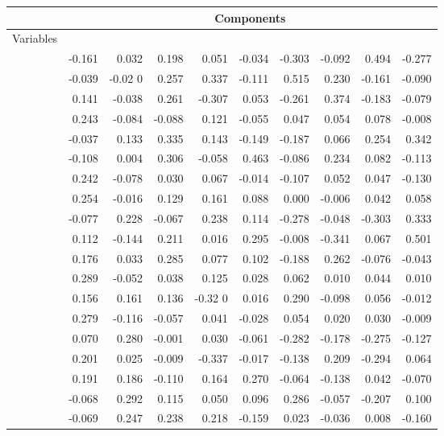 \documentclass[10pt]{article}
\begin{document}
\begin{table}
\begin{center}
\begin{tabular}{crrrrrrrrr}
\hline
			& \multicolumn{9}{c}{Components}																					\\\hline
Variables   &	  &          & 	   &       &	   &	   &	  	&	  &	 	\\
\hline
	&	-0.161	&	0.032	&	0.198	&	0.051	&	-0.034	&	-0.303	&	-0.092	&	0.494	&	-0.277	\\
	&	-0.039	&	-0.02	0       &	0.257	&	0.337	&	-0.111	&	0.515	&	0.230	&	-0.161	&	-0.090	\\
	&	0.141	&	-0.038	&	0.261	&	-0.307	&	0.053	&	-0.261	&	0.374	&	-0.183	&	-0.079	\\
	&	0.243	&	-0.084	&	-0.088	&	0.121	&	-0.055	&	0.047	&	0.054	&	0.078	&	-0.008	\\
	&	-0.037	&	0.133	&	0.335	&	0.143	&	-0.149	&	-0.187	&	0.066	&	0.254	&	0.342	\\
	&	-0.108	&	0.004	&	0.306	&	-0.058	&	0.463	&	-0.086	&	0.234	&	0.082	&	-0.113	\\
	&	0.242	&	-0.078	&	0.030	&	0.067	&	-0.014	&	-0.107	&	0.052	&	0.047	&	-0.130	\\
	&	0.254	&	-0.016	&	0.129	&	0.161	&	0.088	&	0.000	&	-0.006	&	0.042	&	0.058	\\
	&	-0.077	&	0.228	&	-0.067	&	0.238	&	0.114	&	-0.278	&	-0.048	&	-0.303	&	0.333	\\
	&	0.112	&	-0.144	&	0.211	&	0.016	&	0.295	&	-0.008	&	-0.341	&	0.067	&	0.501	\\
	&	0.176	&	0.033	&	0.285	&	0.077	&	0.102	&	-0.188	&	0.262	&	-0.076	&	-0.043	\\
  &	0.289	&	-0.052	&	0.038	&	0.125	&	0.028	&	0.062	&	0.010	&	0.044	&	0.010	\\
	 &	0.156	&	0.161	&	0.136	&	-0.32	0      &	0.016	&	0.290	&	-0.098	&	0.056	&	-0.012	\\
	&	0.279	&	-0.116	&	-0.057	&	0.041	&	-0.028	&	0.054	&	0.020	&	0.030	&	-0.009	\\
	&	0.070       &	0.280    	&	-0.001	&	0.030	&	-0.061	&	-0.282	&	-0.178	&	-0.275	&	-0.127	\\
	  &	0.201	&	0.025	&	-0.009	&	-0.337	&	-0.017	&	-0.138	&	0.209	&	-0.294	&	0.064	\\
	&	0.191	&	0.186	&	-0.110	&	0.164	&	0.270	&	-0.064	&	-0.138	&	0.042	&	-0.070     \\	
	&	-0.068	&	0.292	&	0.115	&	0.050	&	0.096	&	0.286	&	-0.057	&	-0.207	&	0.100	\\
	&	-0.069	&	0.247	&	0.238	&	0.218	&	-0.159	&	0.023	&	-0.036	&	0.008	&	-0.160	\\

\end{tabular}
\end{center}
\end{table}
\end{document}
